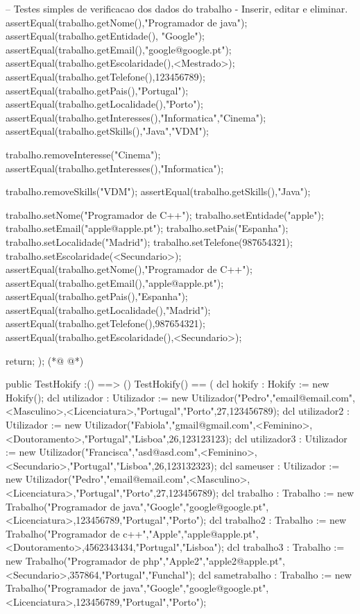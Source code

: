 \begin{vdmpp}[breaklines=true]
 -- Testes simples de verificacao dos dados do trabalho - Inserir, editar e eliminar.
 assertEqual(trabalho.getNome(),"Programador de java");
 assertEqual(trabalho.getEntidade(), "Google");
 assertEqual(trabalho.getEmail(),"google@google.pt");
 assertEqual(trabalho.getEscolaridade(),<Mestrado>);
 assertEqual(trabalho.getTelefone(),123456789);
 assertEqual(trabalho.getPais(),"Portugal");
 assertEqual(trabalho.getLocalidade(),"Porto");
 assertEqual(trabalho.getInteresses(),{"Informatica","Cinema"});
 assertEqual(trabalho.getSkills(),{"Java","VDM"});
 
 trabalho.removeInteresse("Cinema");
 assertEqual(trabalho.getInteresses(),{"Informatica"});
 
 trabalho.removeSkills("VDM");
 assertEqual(trabalho.getSkills(),{"Java"});
 
 trabalho.setNome("Programador de C++");
 trabalho.setEntidade("apple");
 trabalho.setEmail("apple@apple.pt");
 trabalho.setPais("Espanha");
 trabalho.setLocalidade("Madrid");
 trabalho.setTelefone(987654321);
 trabalho.setEscolaridade(<Secundario>);
 assertEqual(trabalho.getNome(),"Programador de C++");
 assertEqual(trabalho.getEmail(),"apple@apple.pt");
 assertEqual(trabalho.getPais(),"Espanha");
 assertEqual(trabalho.getLocalidade(),"Madrid");
 assertEqual(trabalho.getTelefone(),987654321);
 assertEqual(trabalho.getEscolaridade(),<Secundario>);

 return;
);
(*@
\label{TestHokify:102}
@*)


public TestHokify :() ==> ()
TestHokify() ==
(
 dcl hokify : Hokify := new Hokify();
 dcl utilizador : Utilizador := new Utilizador("Pedro","email@email.com",<Masculino>,<Licenciatura>,"Portugal","Porto",27,123456789);
 dcl utilizador2 : Utilizador := new Utilizador("Fabiola","gmail@gmail.com",<Feminino>,<Doutoramento>,"Portugal","Lisboa",26,123123123);
 dcl utilizador3 : Utilizador := new Utilizador("Francisca","asd@asd.com",<Feminino>,<Secundario>,"Portugal","Lisboa",26,123132323);
 dcl sameuser : Utilizador := new Utilizador("Pedro","email@email.com",<Masculino>,<Licenciatura>,"Portugal","Porto",27,123456789);
 dcl trabalho : Trabalho := new Trabalho("Programador de java","Google","google@google.pt",<Licenciatura>,123456789,"Portugal","Porto");
 dcl trabalho2 : Trabalho := new Trabalho("Programador de c++","Apple","apple@apple.pt",<Doutoramento>,4562343434,"Portugal","Lisboa");
 dcl trabalho3 : Trabalho := new Trabalho("Programador de php","Apple2","apple2@apple.pt",<Secundario>,357864,"Portugal","Funchal");
 dcl sametrabalho : Trabalho := new Trabalho("Programador de java","Google","google@google.pt",<Licenciatura>,123456789,"Portugal","Porto");
 

\end{vdmpp}
